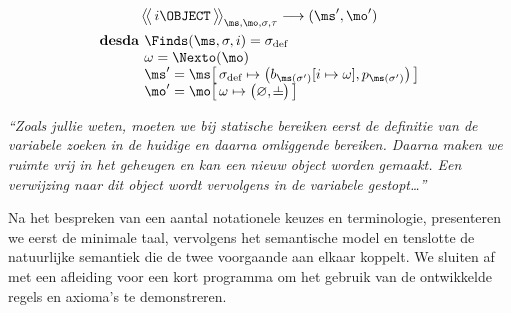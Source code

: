 \begin{htmlskip}
  \begin{multicols}{2}
    \small
    \raggedcolumns
    \setlength{\columnseprule}{.5pt}
    \begin{minipage}{.25\textwidth}\vspace*{-1.1pc}%
\begin{gather*}
  \Config{i \OBJECT}{\ms, \mo, \sigma, \tau}
  \longrightarrow
  (\ms', \mo') \\
  \begin{array}{r@{}l}%
    \textbf{desda } & \Finds(\ms, \sigma, i) = \sigma_\text{def} \\
    & \omega = \Nexto(\mo) \\
    & \ms' = \ms \surr{ \sigma_\text{def} \mapsto \big(b_{\ms(\sigma')}[i\mapsto \omega], p_{\ms(\sigma')}\big) } \\
    & \mo' = \mo \surr{ \omega \mapsto \big(\varnothing, \nil\big) }
  \end{array}
\end{gather*}%
    \end{minipage}
    
    \columnbreak
    
    \textit{“Zoals jullie weten, moeten we bij statische bereiken eerst de definitie van de variabele zoeken in de huidige en daarna omliggende bereiken. Daarna maken we ruimte vrij in het geheugen en kan een nieuw object worden gemaakt. Een verwijzing naar dit object wordt vervolgens in de variabele gestopt\dots”}
  \end{multicols}
\end{htmlskip}

Na het bespreken van een aantal notationele keuzes en terminologie, presenteren we eerst de minimale taal, vervolgens het semantische model en tenslotte de natuurlijke semantiek die de twee voorgaande aan elkaar koppelt. We sluiten af met een afleiding voor een kort programma om het gebruik van de ontwikkelde regels en axioma's te demonstreren.

